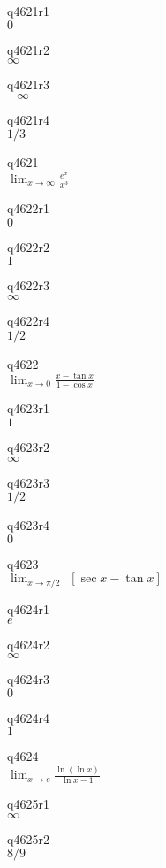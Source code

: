 q4621r1\\
\(\displaystyle 0 \)

q4621r2\\
\(\displaystyle \infty \)

q4621r3\\
\(\displaystyle -\infty \)

q4621r4\\
\(\displaystyle 1/3 \)

q4621\\
\(\displaystyle \lim_{x \rightarrow \infty} \frac{e^x}{x^3} \)

q4622r1\\
\(\displaystyle 0 \)

q4622r2\\
\(\displaystyle 1 \)

q4622r3\\
\(\displaystyle \infty \)

q4622r4\\
\(\displaystyle 1/2 \)

q4622\\
\(\displaystyle \lim_{x \rightarrow 0} \frac{x - \tan x}{1 - \cos x} \)

q4623r1\\
\(\displaystyle 1 \)

q4623r2\\
\(\displaystyle \infty \)

q4623r3\\
\(\displaystyle 1/2 \)

q4623r4\\
\(\displaystyle 0 \)

q4623\\
\(\displaystyle \lim_{x \rightarrow \pi/2^-} [ \sec x - \tan x] \)

q4624r1\\
\(\displaystyle e \)

q4624r2\\
\(\displaystyle \infty \)

q4624r3\\
\(\displaystyle 0 \)

q4624r4\\
\(\displaystyle 1 \)

q4624\\
\(\displaystyle \lim_{x \rightarrow e} \frac{\ln (\ln x)}{\ln x - 1} \)

q4625r1\\
\(\displaystyle \infty \)

q4625r2\\
\(\displaystyle 8/9 \)

